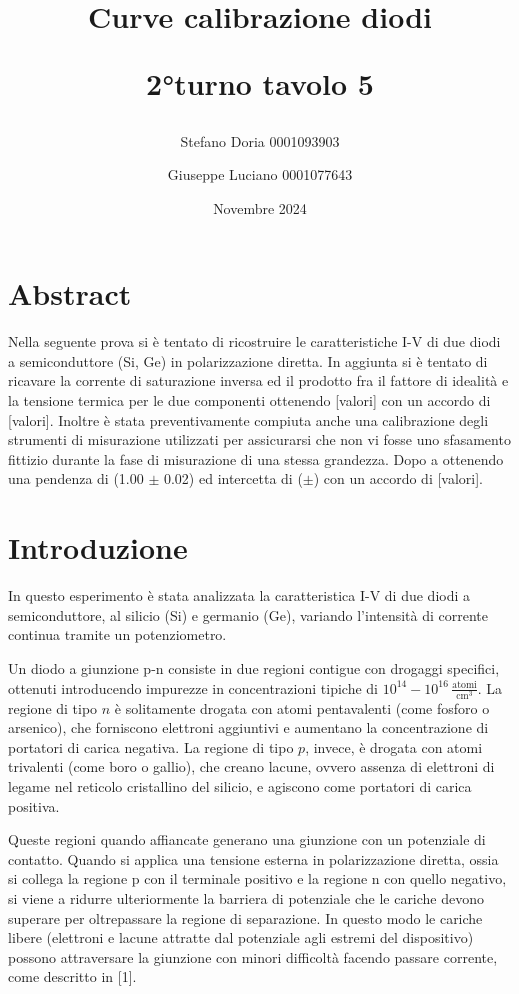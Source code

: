 \documentclass[a4paper,11pt]{article}
\begin{document}
\title{\textbf{Curve calibrazione diodi}

2°turno tavolo 5}
\author{Stefano Doria 0001093903 \and Giuseppe Luciano 0001077643}

\date{Novembre 2024}

\maketitle

\section{Abstract}
Nella seguente prova si è tentato di ricostruire le caratteristiche I-V di due diodi a semiconduttore (Si, Ge) in polarizzazione diretta. In aggiunta si è tentato di ricavare la corrente di saturazione inversa ed il prodotto fra il fattore di idealità e la tensione termica per le due componenti ottenendo [valori] con un accordo di [valori]. Inoltre è stata preventivamente compiuta anche una calibrazione degli strumenti di misurazione utilizzati per assicurarsi che non vi fosse uno sfasamento fittizio durante la fase di misurazione di una stessa grandezza. Dopo a ottenendo una pendenza di (1.00 $\pm$ 0.02) ed intercetta di ($\pm$)  con un accordo di [valori].

\section*{Introduzione}
In questo esperimento è stata analizzata la caratteristica I-V di due diodi a semiconduttore, al silicio (Si) e germanio (Ge), variando l’intensità di corrente continua tramite un potenziometro. 

Un diodo a giunzione p-n consiste in due regioni contigue con drogaggi specifici, ottenuti introducendo impurezze in concentrazioni tipiche di $10^{14} - 10^{16} \, \mathrm{\frac{atomi}{cm^3}}$. La regione di tipo $n$ è solitamente drogata con atomi pentavalenti (come fosforo o arsenico), che forniscono elettroni aggiuntivi e aumentano la concentrazione di portatori di carica negativa. La regione di tipo $p$, invece, è drogata con atomi trivalenti (come boro o gallio), che creano lacune, ovvero assenza di elettroni di legame nel reticolo cristallino del silicio, e agiscono come portatori di carica positiva.

Queste regioni quando affiancate generano una giunzione con un potenziale di contatto. Quando si applica una tensione esterna in polarizzazione diretta, ossia si collega la regione p con il terminale
positivo e la regione n con quello negativo, si viene a ridurre ulteriormente la barriera di potenziale che le cariche devono superare per oltrepassare la regione di separazione. In questo modo le cariche libere (elettroni e lacune attratte dal potenziale agli estremi del dispositivo) possono attraversare la giunzione con minori difficoltà facendo passare corrente, come descritto in [1].
\end{document}
